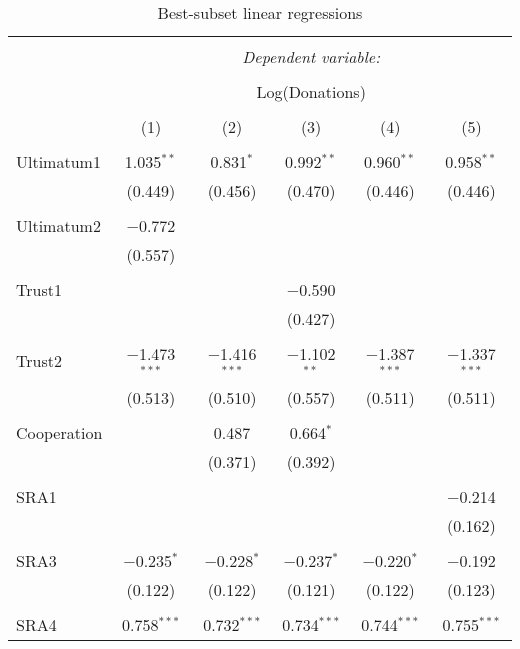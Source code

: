 \begin{table}[H] \centering 
  \caption{Best-subset linear regressions} 
  \label{} 
  \begin{adjustbox}{width=\textwidth}
\begin{tabular}{@{\extracolsep{5pt}}lccccc} 
\\[-1.8ex]\hline 
\hline \\[-1.8ex] 
 & \multicolumn{5}{c}{\textit{Dependent variable:}} \\ 
\cline{2-6} 
\\[-1.8ex] & \multicolumn{5}{c}{Log(Donations)} \\ 
\\[-1.8ex] & (1) & (2) & (3) & (4) & (5)\\ 
\hline \\[-1.8ex] 
 Ultimatum1 & 1.035$^{**}$ & 0.831$^{*}$ & 0.992$^{**}$ & 0.960$^{**}$ & 0.958$^{**}$ \\ 
  & (0.449) & (0.456) & (0.470) & (0.446) & (0.446) \\ 
  & & & & & \\ 
 Ultimatum2 & $-$0.772 &  &  &  &  \\ 
  & (0.557) &  &  &  &  \\ 
  & & & & & \\ 
 Trust1 &  &  & $-$0.590 &  &  \\ 
  &  &  & (0.427) &  &  \\ 
  & & & & & \\ 
 Trust2 & $-$1.473$^{***}$ & $-$1.416$^{***}$ & $-$1.102$^{**}$ & $-$1.387$^{***}$ & $-$1.337$^{***}$ \\ 
  & (0.513) & (0.510) & (0.557) & (0.511) & (0.511) \\ 
  & & & & & \\ 
 Cooperation &  & 0.487 & 0.664$^{*}$ &  &  \\ 
  &  & (0.371) & (0.392) &  &  \\ 
  & & & & & \\ 
 SRA1 &  &  &  &  & $-$0.214 \\ 
  &  &  &  &  & (0.162) \\ 
  & & & & & \\ 
 SRA3 & $-$0.235$^{*}$ & $-$0.228$^{*}$ & $-$0.237$^{*}$ & $-$0.220$^{*}$ & $-$0.192 \\ 
  & (0.122) & (0.122) & (0.121) & (0.122) & (0.123) \\ 
  & & & & & \\ 
 SRA4 & 0.758$^{***}$ & 0.732$^{***}$ & 0.734$^{***}$ & 0.744$^{***}$ & 0.755$^{***}$ \\ 

\end{tabular}
\end{adjustbox}
\end{table}
